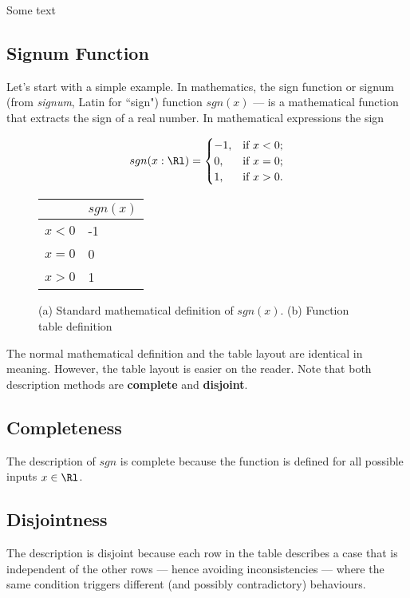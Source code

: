 \begin{textbox}
Some text
\end{textbox}

\subsection{Signum Function}
Let's start with a simple example. In mathematics, the sign function or signum  (from \emph{signum}, Latin for ``sign") function $sgn(x)$ --- is a mathematical function that extracts the sign of a real number. In mathematical expressions the sign 

\begin{figure}[ht]
\begin{mdframed}[outerlinewidth=0.5,roundcorner=5pt]
\begin{minipage}{.4\textwidth}
\[sgn(x:\Rl) =
\begin{cases}
-1, &\text{if $x < 0$;}\\
0, &\text{if $x=0$;}\\
1, &\text{if $x >0$.}
\end{cases}\]
\end{minipage}
\qquad\qquad\qquad
\begin{minipage}{.5\textwidth}
\begin{tabular}{|l|l|}
\hline
        & $sgn(x)$ \\ \hline
$x < 0$ & -1     \\ \hline
$x = 0$ & 0      \\ \hline
$x > 0$ & 1      \\ \hline
\end{tabular}
\end{minipage}
\end{mdframed}
\caption{\small (a) Standard mathematical definition of $sgn(x)$. (b) Function table definition}
\end{figure}

The normal mathematical definition and the table layout are identical in meaning. However, the table layout is easier on the reader. Note that both description methods are \textbf{complete} and \textbf{disjoint}. 

\subsection*{Completeness}
The description of $sgn$ is complete because the function is defined for all possible inputs $x\in \Rl$. 

\subsection*{Disjointness}
The description is disjoint because each row in the table describes a case that is independent of the other rows --- hence avoiding inconsistencies 
--- where the same condition triggers different (and possibly contradictory) behaviours. 

